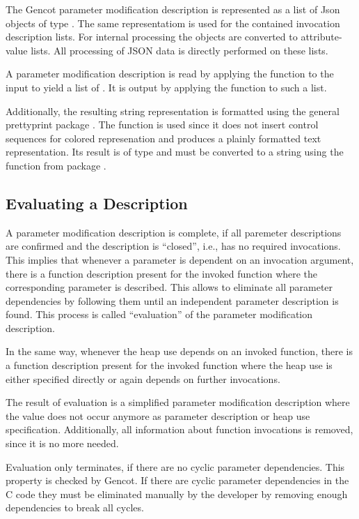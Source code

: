 The Gencot parameter modification description is represented as a list of Json objects of type .
The same representatiom is used for the contained invocation description lists. For internal processing the objects
are converted to attribute-value lists. All processing of JSON data is directly performed on these lists.

A parameter modification description is read by applying the  function to the input to yield a
list of . It is output by applying the  function to such a list. 

Additionally,
the resulting string representation is formatted using the general prettyprint package .
The function  is used since it does not insert control sequences for colored represenation
and produces a plainly formatted text representation. Its result is of type  and must be converted to a
string using the function  from package .

\subsection{Evaluating a Description}
\label{impl-parmod-eval}

A parameter modification description is complete, if all paremeter descriptions are confirmed and the description 
is ``closed'', i.e., has no required invocations. This implies that whenever a parameter is dependent on an invocation argument,
there is a function description present for the invoked function where the corresponding parameter is described.
This allows to eliminate all parameter dependencies by following them until an independent parameter description is found.
This process is called ``evaluation'' of the parameter modification description.

In the same way, whenever the heap use depends on an invoked function, there is a function description present for the 
invoked function where the heap use is either specified directly or again depends on further invocations.

The result of evaluation is a simplified parameter modification description where the value  does not 
occur anymore as parameter description or heap use specification. Additionally, all information about function invocations 
is removed, since it is no more needed.

Evaluation only terminates, if there are no cyclic parameter dependencies. This property is checked by Gencot. If there
are cyclic parameter dependencies in the C code they must be eliminated manually by the developer by removing enough dependencies 
to break all cycles.

